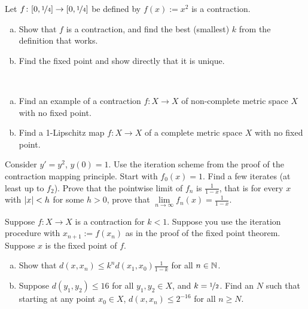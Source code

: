 \begin{exercise}
Let $f \colon [0,\nicefrac{1}{4}] \to [0,\nicefrac{1}{4}]$ be defined by
$f(x) := x^2$ is a contraction.
\begin{enumerate}[a)]
\item
Show that $f$
is a contraction, and find the best (smallest) $k$ from the definition that works.
\item
Find the fixed point and show directly that it is unique.
\end{enumerate}
\end{exercise}

\begin{samepage}
\begin{exercise} \label{exercise:nofixedpoint}
{\ }
\begin{enumerate}[a)]
\item
Find an example of a contraction $f \colon X \to X$
of non-complete metric space $X$ with no
fixed point.
\item
Find a 1-Lipschitz map $f \colon X \to X$ of a complete metric space $X$ with no fixed point.
\end{enumerate}
\end{exercise}
\end{samepage}

\begin{exercise}
Consider $y' =y^2$, $y(0)=1$.  Use the iteration scheme
from the proof of the contraction mapping principle.
Start with $f_0(x) = 1$.  Find a 
few iterates (at least up to $f_2$).  Prove that
the pointwise limit of $f_n$ is $\frac{1}{1-x}$, that is for every $x$
with $\left\lvert {x} \right\rvert < h$ for some $h > 0$,
prove that $\lim\limits_{n\to\infty}f_n(x) = \frac{1}{1-x}$.
\end{exercise}

\begin{exercise}
Suppose $f \colon X \to X$ is a contraction for $k < 1$.  Suppose you use the iteration
procedure with $x_{n+1} := f(x_n)$ as in the proof of the fixed point theorem.
Suppose $x$ is the fixed
point of $f$.
{\ }
\begin{enumerate}[a)]
\item
Show that $d(x,x_n) \leq k^n d(x_1,x_0) \frac{1}{1-k}$ for all $n \in {\mathbb{N}}$.
\item
Suppose $d(y_1,y_2) \leq 16$ for all $y_1,y_2 \in X$, and $k=
\nicefrac{1}{2}$.  Find an $N$ such that starting at any point $x_0 \in X$, 
$d(x,x_n) \leq 2^{-16}$ for all $n \geq N$.
\end{enumerate}
\end{exercise}

